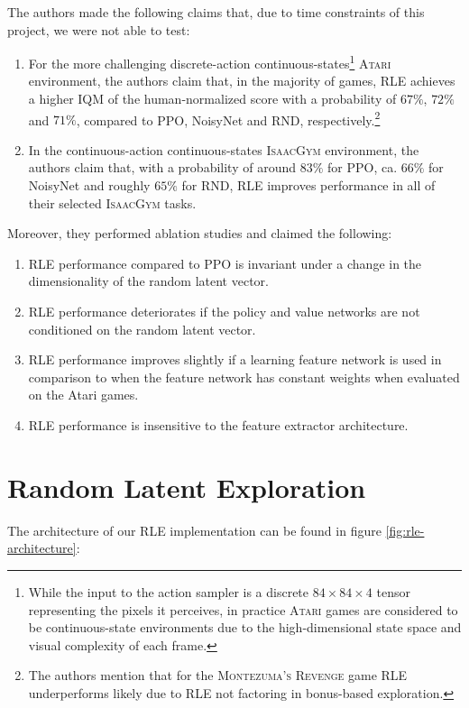 \noindent The authors made the following claims that, due to time constraints of this project, we were not able to test:

\begin{enumerate}
  \item For the more challenging discrete-action continuous-states\footnote{While the input to the action sampler is a discrete $84\times84\times4$ tensor representing the pixels it perceives, in practice \textsc{Atari} games are considered to be continuous-state environments due to the high-dimensional state space and visual complexity of each frame.} \textsc{Atari} environment, the authors claim that, in the majority of games, RLE achieves a higher IQM of the human-normalized score with a probability of $67\%$, $72\%$ and $71\%$, compared to PPO, NoisyNet and RND, respectively.\footnote{The authors mention that for the \textsc{Montezuma's Revenge} game RLE underperforms likely due to RLE not factoring in bonus-based exploration.}
  \item In the continuous-action continuous-states \textsc{IsaacGym} environment, the authors claim that, with a probability of around $83\%$ for PPO, ca. $66\%$ for NoisyNet and roughly $65\%$ for RND, RLE improves performance in all of their selected \textsc{IsaacGym} tasks.
\end{enumerate}

\noindent Moreover, they performed ablation studies and claimed the following:

\begin{enumerate}
  \item RLE performance compared to PPO is invariant under a change in the dimensionality of the random latent vector.
  \item RLE performance deteriorates if the policy and value networks are not conditioned on the random latent vector.
  \item RLE performance improves slightly if a learning feature network is used in comparison to when the feature network has constant weights when evaluated on the Atari games.
  \item RLE performance is insensitive to the feature extractor architecture.
\end{enumerate}

\section{Random Latent Exploration}

\noindent The architecture of our RLE implementation can be found in figure \ref{fig:rle-architecture}:

